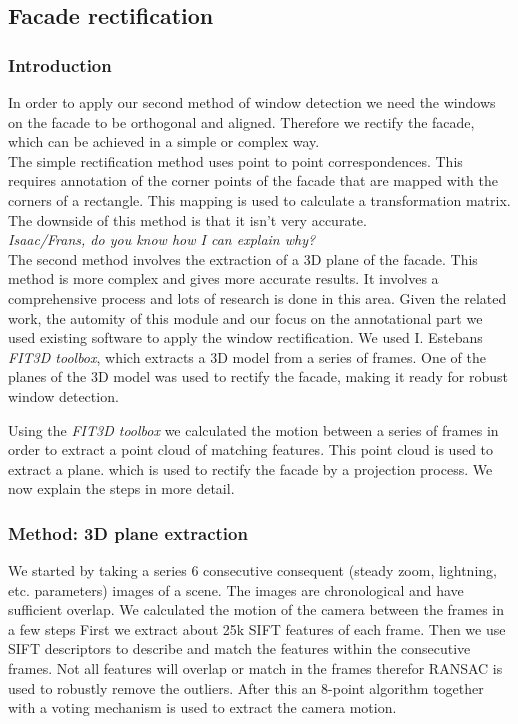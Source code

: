 \subsection{Facade rectification}
\subsubsection{Introduction}
In order to apply our second method of window detection
we need the windows on the facade to be orthogonal and aligned.
Therefore we rectify the facade, which can be achieved in a simple or complex way.\\

The simple rectification method uses point to point correspondences. This 
requires annotation of the corner points of the facade that are mapped with the
corners of a rectangle. This mapping is used to calculate a transformation matrix. 
 The downside of this method is that it isn't very accurate.\\
\emph{Isaac/Frans, do you know how I can explain why?}\\

The second method involves the extraction of a 3D plane of the facade. This 
method is more complex and gives more accurate results. It involves a
comprehensive process and lots of research is done in this area. 
Given the related work, the automity of this module and our focus on the annotational part
we used existing software to apply the window rectification.
We used I. Estebans \emph{FIT3D toolbox}, which extracts a 3D model from a
series of frames.  One of the planes of the 3D model was used to rectify the
facade, making it ready for robust window detection. 

Using the \emph{FIT3D toolbox} we calculated the motion between a series of frames in order to extract a
point cloud of matching features. This point cloud is used to extract a plane.
which is used to rectify the facade by a projection process.  We now explain the steps in more detail.

\subsubsection{Method: 3D plane extraction}
We started by taking a series 6 consecutive consequent (steady zoom, lightning, etc. parameters) images of a scene.
The images are chronological and have sufficient overlap. 
We calculated the motion of the camera between the frames in a few steps
First we extract about 25k SIFT features of each frame.  Then we use
SIFT descriptors to describe and match the features within the consecutive
frames.  Not all features will overlap or match in the frames therefor RANSAC is used to
robustly remove the outliers.  After this an 8-point algorithm together with a
voting mechanism is used to extract the camera motion.

